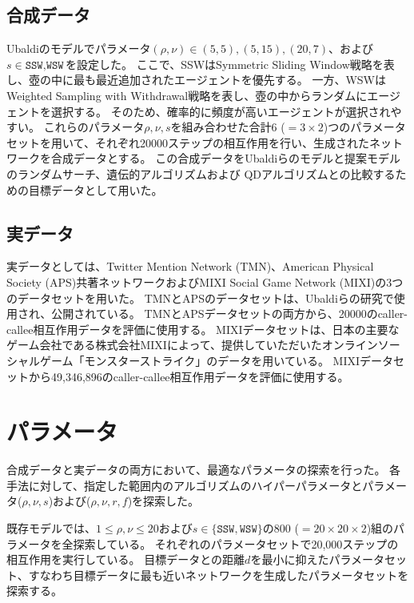 \documentclass[uplatex,11pt,openany]{ujreport}
\begin{document}
        \subsection{合成データ}
            Ubaldiのモデルでパラメータ$(\rho,\nu)\in {(5,5),(5,15),(20,7)}$、および$s\in{\texttt{SSW},\texttt{WSW}}$を設定した。
            ここで、SSWはSymmetric Sliding Window戦略を表し、壺の中に最も最近追加されたエージェントを優先する。
            一方、WSWはWeighted Sampling with Withdrawal戦略を表し、壺の中からランダムにエージェントを選択する。
            そのため、確率的に頻度が高いエージェントが選択されやすい。
            これらのパラメータ$\rho,\nu,s$を組み合わせた合計6 ($=3\times2$)つのパラメータセットを用いて、それぞれ20000ステップの相互作用を行い、生成されたネットワークを合成データとする。
            この合成データをUbaldiらのモデルと提案モデルのランダムサーチ、遺伝的アルゴリズムおよび QDアルゴリズムとの比較するための目標データとして用いた。

        \subsection{実データ}
            実データとしては、Twitter Mention Network (TMN)、American Physical Society (APS)共著ネットワークおよびMIXI Social Game Network (MIXI)の3つのデータセットを用いた。
            TMNとAPSのデータセットは、Ubaldiらの研究\cite{ubaldiEmergenceEvolutionSocial2021}で使用され、公開されている。
            TMNとAPSデータセットの両方から、20000のcaller-callee相互作用データを評価に使用する。
            MIXIデータセットは、日本の主要なゲーム会社である株式会社MIXIによって、提供していただいたオンラインソーシャルゲーム「モンスターストライク」のデータを用いている。
            MIXIデータセットから49,346,896のcaller-callee相互作用データを評価に使用する。

    \section{パラメータ}
        合成データと実データの両方において、最適なパラメータの探索を行った。
        各手法に対して、指定した範囲内のアルゴリズムのハイパーパラメータとパラメータ($\rho,\nu,s$)および($\rho,\nu,r,f$)を探索した。

        既存モデルでは、$1\leq \rho,\nu\leq20$および$s\in\{\texttt{SSW},\texttt{WSW}\}$の800 ($=20\times20\times2$)組のパラメータを全探索している。
        それぞれのパラメータセットで20,000ステップの相互作用を実行している。
        目標データとの距離$d$を最小に抑えたパラメータセット、すなわち目標データに最も近いネットワークを生成したパラメータセットを探索する。
\end{document}
